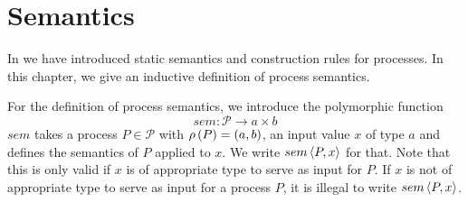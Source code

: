 \section{Semantics}
\label{chp:semantics}
In  we have introduced static semantics and construction rules for processes. In this chapter, we give an inductive definition of process semantics. %



For the definition of process semantics, we introduce the polymorphic function 
\begin{equation*}
  sem \colon \mathcal{P} \to a \times b
\end{equation*}
$sem$ takes a process $P \in \mathcal{P}$ with $\rho \left( P \right) = \left( a, b \right)$, an input value $x$ of type $a$ and defines the semantics of $P$ applied to $x$. We write $sem \left\langle P, x \right\rangle$ for that. Note that this is only valid if $x$ is of appropriate type to serve as input for $P$. If $x$ is not of appropriate type to serve as input for a process $P$, it is illegal to write $sem \left\langle P, x \right\rangle$.


